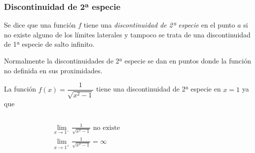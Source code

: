 	
	\begin{frame}
		\frametitle{Discontinuidad de 2ª especie}
		\begin{definicion}
			Se dice que una función $f$ tiene una \emph{discontinuidad de 2ª especie} en el punto $a$ si
			no existe alguno de los límites laterales y tampoco se trata de una discontinuidad de 1ª especie de salto infinito.
		\end{definicion}
		
		Normalmente la discontinuidades de 2ª especie se dan en puntos donde la función no definida en sus proximidades.
		
		 La función $f(x)=\dfrac{1}{\sqrt{x^2-1}}$ tiene una discontinuidad de 2ª especie en $x=1$ ya que
		\begin{columns}
			\begin{column}{0.3\textwidth}
				\begin{align*}
					  & \lim_{x\rightarrow 1^-}\frac{1}{\sqrt{x^2-1}} \textrm{ no existe} \\
					  & \lim_{x\rightarrow 1^+}\frac{1}{\sqrt{x^2-1}}=\infty              
				\end{align*}
			\end{column}
			\begin{column}{0.5\textwidth}
				\begin{center}
					\scalebox{1}{}
				\end{center}
			\end{column}
		\end{columns}
	\end{frame} 
